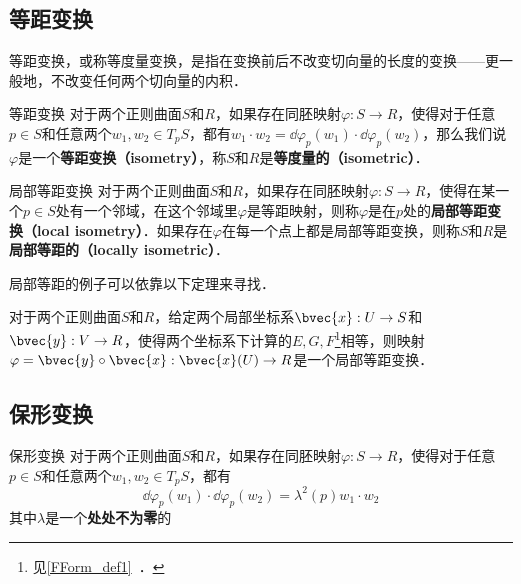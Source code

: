 
\subsection{等距变换}
等距变换，或称等度量变换，是指在变换前后不改变切向量的长度的变换——更一般地，不改变任何两个切向量的内积．

\begin{definition}{等距变换}
对于两个正则曲面$S$和$R$，如果存在同胚映射$\varphi:S\to R$，使得对于任意$p\in S$和任意两个$w_1, w_2\in T_pS$，都有$w_1\cdot w_2=\dd\varphi_p(w_1)\cdot\dd\varphi_p(w_2)$，那么我们说$\varphi$是一个\textbf{等距变换（isometry）}，称$S$和$R$是\textbf{等度量的（isometric）}．
\end{definition}

\begin{definition}{局部等距变换}
对于两个正则曲面$S$和$R$，如果存在同胚映射$\varphi:S\to R$，使得在某一个$p\in S$处有一个邻域，在这个邻域里$\varphi$是等距映射，则称$\varphi$是在$p$处的\textbf{局部等距变换（local isometry）}．如果存在$\varphi$在每一个点上都是局部等距变换，则称$S$和$R$是\textbf{局部等距的（locally isometric）}．
\end{definition}

局部等距的例子可以依靠以下定理来寻找．

\begin{theorem}{}
对于两个正则曲面$S$和$R$，给定两个局部坐标系$\bvec{x}:U\to S$和$\bvec{y}:V\to R$，使得两个坐标系下计算的$E, G, F$\footnote{见\autoref{FForm_def1}~．}相等，则映射$\varphi=\bvec{y}\circ\bvec{x}:\bvec{x}(U)\to R$是一个局部等距变换．
\end{theorem}

\subsection{保形变换}

\begin{definition}{保形变换}
对于两个正则曲面$S$和$R$，如果存在同胚映射$\varphi:S\to R$，使得对于任意$p\in S$和任意两个$w_1, w_2\in T_pS$，都有\begin{equation}
\dd\varphi_p(w_1)\cdot\dd\varphi_p(w_2)=\lambda^2(p)w_1\cdot w_2
\end{equation}
其中$\lambda$是一个\textbf{处处不为零}的
\end{definition}



